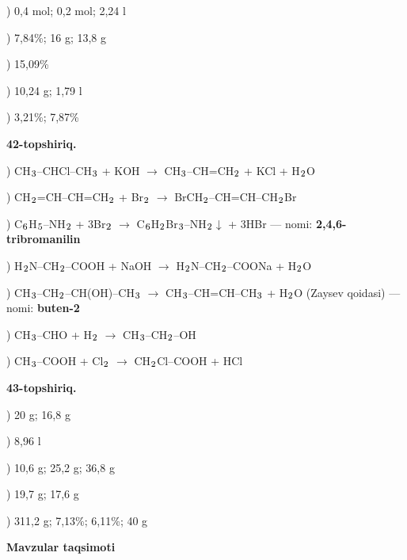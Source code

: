 \documentclass[11pt,a4paper]{article}
\renewcommand{\textsubscript}[1]{\ensuremath{_{\text{\fontsize{8}{8}\selectfont #1}}}}
\begin{document}
) 0,4 mol; 0,2 mol; 2,24 l\par
{}) 7,84\%; 16 g; 13,8 g\par
{}) 15,09\%\par
{}) 10,24 g; 1,79 l\par
{}) 3,21\%; 7,87\%\par
\noindent\textbf{42-topshiriq.}\par
{}) CH\textsubscript{3}--CHCl--CH\textsubscript{3} + KOH $\to$ CH\textsubscript{3}--CH=CH\textsubscript{2} + KCl + H\textsubscript{2}O\par
{}) CH\textsubscript{2}=CH--CH=CH\textsubscript{2} + Br\textsubscript{2} $\to$ BrCH\textsubscript{2}--CH=CH--CH\textsubscript{2}Br\par
{}) C\textsubscript{6}H\textsubscript{5}--NH\textsubscript{2} + 3Br\textsubscript{2} $\to$ C\textsubscript{6}H\textsubscript{2}Br\textsubscript{3}--NH\textsubscript{2}$\downarrow$ + 3HBr --- nomi: \textbf{2,4,6-tribromanilin}\par
{}) H\textsubscript{2}N--CH\textsubscript{2}--COOH + NaOH $\to$ H\textsubscript{2}N--CH\textsubscript{2}--COONa + H\textsubscript{2}O\par
{}) CH\textsubscript{3}--CH\textsubscript{2}--CH(OH)--CH\textsubscript{3} $\to$ CH\textsubscript{3}--CH=CH--CH\textsubscript{3} + H\textsubscript{2}O (Zaysev qoidasi) --- nomi: \textbf{buten-2}\par
{}) CH\textsubscript{3}--CHO + H\textsubscript{2} $\to$ CH\textsubscript{3}--CH\textsubscript{2}--OH\par
{}) CH\textsubscript{3}--COOH + Cl\textsubscript{2} $\to$ CH\textsubscript{2}Cl--COOH + HCl\par
\noindent\textbf{43-topshiriq.}\par
{}) 20 g; 16,8 g\par
{}) 8,96 l\par
{}) 10,6 g; 25,2 g; 36,8 g\par
{}) 19,7 g; 17,6 g\par
{}) 311,2 g; 7,13\%; 6,11\%; 40 g\par
\par\bigskip\noindent\textbf{Mavzular taqsimoti}\par\smallskip
\end{document}
